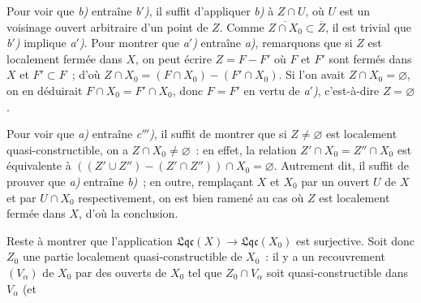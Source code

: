Pour voir que \emph{b)} entraîne \emph{b$'$)}, il suffit d'appliquer
\emph{b)} à $Z\cap U$, où $U$ est un voisinage ouvert arbitraire d'un point de
$Z$. Comme $\overline{Z\cap X_0}\subset\overline{Z}$, il est trivial
que \emph{b$'$)} implique \emph{a$'$)}. Pour montrer que \emph{a$'$)} entraîne
\emph{a)}, remarquons que si $Z$ est localement fermée dans $X$, on peut
écrire $Z=F-F'$ où $F$ et $F'$ sont fermés dans $X$ et $F'\subset F$~; d'où
$Z\cap X_0=(F\cap X_0)-(F'\cap X_0)$. Si l'on avait
$Z\cap X_0=\varnothing$, on en déduirait $F\cap X_0=F'\cap X_0$, donc
$F=F'$ en vertu de \emph{a$'$)}, c'est-à-dire $Z=\varnothing$.

Pour voir que \emph{a)} entraîne \emph{c$'''$)}, il suffit de montrer que si
$Z\neq\varnothing$ est localement quasi-constructible, on a
$Z\cap X_0\neq\varnothing$~: en effet, la relation
$Z'\cap X_0=Z''\cap X_0$ est équivalente à
$((Z'\cup Z'')-(Z'\cap Z''))\cap X_0=\varnothing$. Autrement dit, il suffit de
prouver que \emph{a)} entraîne \emph{b)}~; en outre, remplaçant $X$ et $X_0$
par un ouvert $U$ de $X$ et par $U\cap X_0$ respectivement, on est bien
ramené au cas où $Z$ est localement fermée dans $X$, d'où la conclusion.

Reste à montrer que l'application
$\mathfrak{Lqc}(X)\to\mathfrak{Lqc}(X_0)$ est surjective. Soit donc $Z_0$ une
partie localement quasi-constructible de $X_0$~: il y a un recouvrement
$(V_\alpha)$ de $X_0$ par des ouverts de $X_0$ tel que $Z_0\cap V_\alpha$ soit
quasi-constructible dans $V_\alpha$ (et

